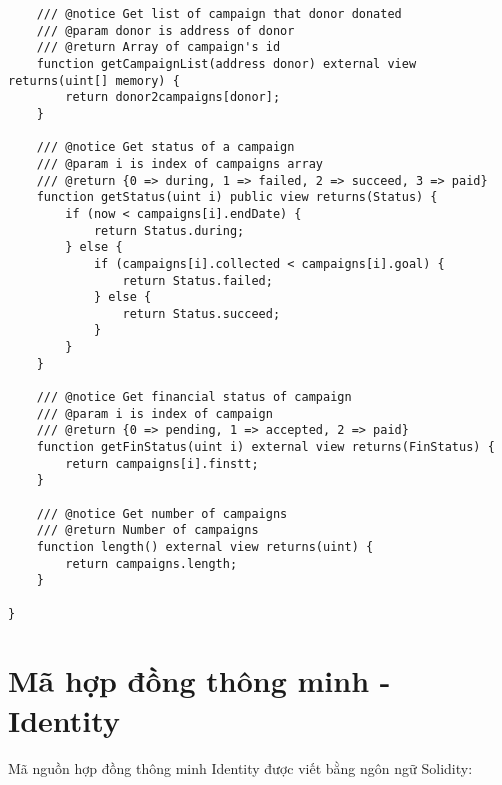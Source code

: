 \documentclass[../main-report.tex]{subfiles}
\begin{document}
\begin{lstlisting}
    /// @notice Get list of campaign that donor donated
    /// @param donor is address of donor
    /// @return Array of campaign's id
    function getCampaignList(address donor) external view returns(uint[] memory) {
        return donor2campaigns[donor];
    }

    /// @notice Get status of a campaign
    /// @param i is index of campaigns array
    /// @return {0 => during, 1 => failed, 2 => succeed, 3 => paid}
    function getStatus(uint i) public view returns(Status) {
        if (now < campaigns[i].endDate) {
            return Status.during;
        } else {
            if (campaigns[i].collected < campaigns[i].goal) {
                return Status.failed;
            } else {
                return Status.succeed;
            }
        }
    }

    /// @notice Get financial status of campaign
    /// @param i is index of campaign
    /// @return {0 => pending, 1 => accepted, 2 => paid}
    function getFinStatus(uint i) external view returns(FinStatus) {
        return campaigns[i].finstt;
    }

    /// @notice Get number of campaigns
    /// @return Number of campaigns
    function length() external view returns(uint) {
        return campaigns.length;
    }

}
\end{lstlisting}

\chapter{Mã hợp đồng thông minh - Identity}
Mã nguồn hợp đồng thông minh Identity được viết bằng ngôn ngữ Solidity:
\end{document}
